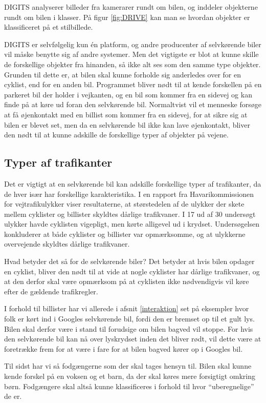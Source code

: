 DIGITS analyserer billeder fra kamerarer rundt om bilen, og inddeler objekterne rundt om bilen i klasser. På figur \ref{fig:DRIVE} kan man se hvordan objekter er klassificeret på et stilbillede.

DIGITS er selvfølgelig kun \'en platform, og andre producenter af selvkørende biler vil måske benytte sig af andre systemer. Men det vigtigste er blot at kunne skille de forskellige objekter fra hinanden\cite{cnet}, så ikke alt ses som den samme type objekter. Grunden til dette er, at bilen skal kunne forholde sig anderledes over for en cyklist, end for en anden bil. Programmet bliver nødt til at kende forskellen på en parkeret bil der holder i vejkanten, og en bil som kommer fra en sidevej og kan finde på at køre ud foran den selvkørende bil. Normaltvist vil et menneske forsøge at få øjenkontakt med en billist som kommer fra en sidevej, for at sikre sig at bilen er blevet set, men da en selvkørende bil ikke kan lave øjenkontakt, bliver den nødt til at kunne adskille de forskellige typer af objekter på vejene.

\subsection{Typer af trafikanter}
Det er vigtigt at en selvkørende bil kan adskille forskellige typer af trafikanter, da de hver især har forskellige karakteristika. I en rapport fra Havarikommissionen for vejtrafikulykker viser resultaterne, at størstedelen af de ulykker der skete mellem cyklister og billister skyldtes dårlige trafikvaner\cite{HVU}. I 17 ud af 30 undersøgt ulykker havde cyklisten vigepligt, men kørte alligevel ud i krydset. Undersøgelsen konkluderer at både cyklister og billister var opmærksomme, og at ulykkerne overvejende skyldtes dårlige trafikvaner. 

Hvad betyder det så for de selvkørende biler? Det betyder at hvis bilen opdager en cyklist, bliver den nødt til at vide at nogle cyklister har dårlige trafikvaner, og at den derfor skal være opmærksom på at cyklisten ikke nødvendigvis vil køre efter de gældende trafikregler. 

I forhold til billister har vi allerede i afsnit \ref{interaktion} set på eksempler hvor folk er kørt ind i Googles selvkørende bil, fordi den er bremset op til et gult lys. Bilen skal derfor være i stand til forudsige om bilen bagved vil stoppe. For hvis den selvkørende bil kan nå over lyskrydset inden det bliver rødt, vil dette være at foretrække frem for at være i fare for at bilen bagved kører op i Googles bil.

Til sidst har vi så fodgængerne som der skal tages hensyn til. Bilen skal kunne kende forskel på en voksen og et barn, da der skal køres mere forsigtigt omkring børn. Fodgængere skal altså kunne klassificeres i forhold til hvor ``uberegnelige'' de er. 
